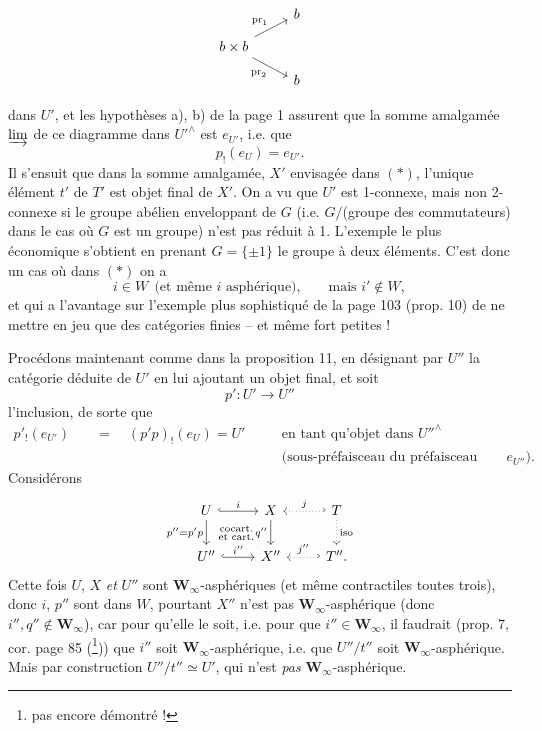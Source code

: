 \documentclass[11pt]{article}
\newcommand{\printedpage}[1]{\marginpar{\footnotesize p.~#1}}
\newcommand{\msp}[1]{\marginpar{\footnotesize [#1]}}
\newcommand{\pr}{\mathrm{pr}}
\newcommand{\Winf}{\mathbf{W}_{\infty}}
\begin{document}
\msp{page 6}
\[
\begin{tikzcd}[row sep=small]
& b \\
b\times b \arrow[ur, "\pr_1"] \arrow[dr, "\pr_2"'] & \\
& b
\end{tikzcd}
\]

\printedpage{5}

dans $U'$, et les hypothèses a), b) de la page 1 assurent que la somme amalgamée $\varinjlim$ de ce diagramme dans $U'^{\wedge}$ est $e_{U'}$, i.e. que
\[ p_!(e_U) = e_{U'}. \]
Il s'ensuit que dans la somme amalgamée, $X'$ envisagée dans $(*)$, l'unique élément $t'$ de $T'$ est objet final de $X'$. On a vu que $U'$ est 1-connexe, mais non 2-connexe si le groupe abélien enveloppant de $G$ (i.e. $G/$(groupe des commutateurs) dans le cas où $G$ est un groupe) n'est pas réduit à 1. L'exemple le plus économique s'obtient en prenant $G = \{\pm 1\}$ le groupe à deux éléments. C'est donc un cas où dans $(*)$ on a
\[ i \in W \ \ \text{(et même $i$ asphérique),} \qquad \text{mais } i' \notin W, \]
et qui a l'avantage sur l'exemple plus sophistiqué de la page 103 (prop. 10) de ne mettre en jeu que des catégories finies -- et même fort petites !

Procédons maintenant comme dans la proposition 11, en désignant par $U''$ la catégorie déduite de $U'$ en lui ajoutant un objet
\msp{page 7}
final, et soit
\[ p' : U' \longrightarrow U'' \]
l'inclusion, de sorte que
\[
\begin{aligned}
p'_!(e_{U'}) \quad &= \quad (p'p)_!(e_U) = U' \quad && \text{en tant qu'objet dans } U''^{\wedge}\\
& && \text{(sous-préfaisceau du préfaisceau final } e_{U''}\text{).}
\end{aligned}
\]
Considérons
\[
\begin{tikzcd}
U \arrow[r, hook, "i"] \arrow[d, "{p''=p'p}"'] \arrow[dr, phantom, "\begin{smallmatrix}\text{cocart.}\\ \text{et cart.}\end{smallmatrix}"] & X \arrow[d, "q''"'] & T \arrow[l, hook', dotted, "j"'] \arrow[d, dotted, "\text{iso}"] \\
U'' \arrow[r, hook, "i''"] & X'' & T''. \arrow[l, hook', dotted, "j''"']
\end{tikzcd}
\]
Cette fois $U$, $X$ \textit{et} $U''$ sont $\Winf$-asphériques (et même contractiles toutes trois), donc $i$, $p''$ sont dans $W$, pourtant $X''$ n'est pas $\Winf$-asphérique (donc $i'', q'' \notin \Winf$), car pour qu'elle le soit, i.e. pour que $i'' \in \Winf$, il faudrait (prop. 7, cor. page 85 (\footnote[4]{pas encore démontré !})) que $i''$ soit $\Winf$-asphérique, i.e. que $U''/t''$ soit $\Winf$-asphérique. Mais par construction $U''/t'' \simeq U'$, qui n'est \textit{pas} $\Winf$-asphérique.
\end{document}
